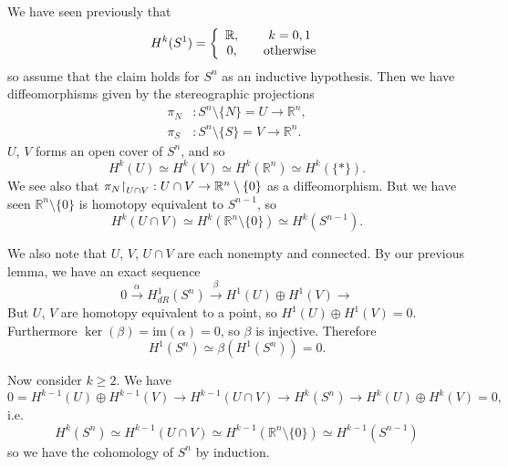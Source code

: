 \begin{xmpl}[Cohomology of $S^n$]
We have seen previously that
$$
  H^k(S^1)
= \left\{
    \begin{array}{c c}
      \mathbb{R}, & \quad k = 0, 1 \\
      0,          & \quad \text{otherwise}
    \end{array}
  \right.
$$
so assume that the claim holds for $S^n$ as an inductive
hypothesis. Then we have diffeomorphisms given by the
stereographic projections
\begin{align*}
   \pi_N
&: S^n \setminus \{ N \} = U \to \mathbb{R}^n, \\
   \pi_S
&: S^n \setminus \{ S \} = V \to \mathbb{R}^n.
\end{align*}
$U$, $V$ forms an open cover of $S^n$, and so
$$
       H^k(U)
\simeq H^k(V)
\simeq H^k(\mathbb{R}^n)
\simeq H^k(\{ \ast \}).
$$
We see also that
$
  \pi_N \mathord{\upharpoonright}_{U \cap V}
: U \cap V \to \mathbb{R}^n \setminus \{ 0 \}
$
as a diffeomorphism. But we have seen
$\mathbb{R}^n \setminus \{ 0 \}$ is homotopy equivalent to
$S^{n-1}$, so
$$
       H^k(U \cap V)
\simeq H^k(\mathbb{R}^n \setminus \{ 0 \})
\simeq H^k(S^{n - 1}).
$$

We also note that $U$, $V$, $U \cap V$ are each nonempty and
connected. By our previous lemma, we have an exact sequence
$$
0                    \xrightarrow{\alpha}
H^1_{dR}(S^n)         \xrightarrow{\beta}
H^1(U) \oplus H^1(V) \xrightarrow{}
$$
But $U$, $V$ are homotopy equivalent to a point, so
$H^1(U) \oplus H^1(V) = 0$. Furthermore
$\ker(\beta) = \mathrm{im}(\alpha) = 0$, so $\beta$ is
injective. Therefore
$$
       H^1(S^n)
\simeq \beta(H^1(S^n))
=      0.
$$

Now consider $k \geq 2$. We have
$$
0 = H^{k-1}(U) \oplus H^{k-1}(V) \xrightarrow{}
H^{k-1}(U \cap V)     \xrightarrow{}
H^k(S^n)             \xrightarrow{}
H^k(U) \oplus H^k(V) = 0,
$$
i.e.
$$
       H^k(S^n)
\simeq H^{k-1}(U \cap V)
\simeq H^{k-1}(\mathbb{R}^n \setminus \{0\})
\simeq H^{k-1}(S^{n-1})
$$
so we have the cohomology of $S^n$ by induction.
\end{xmpl}

